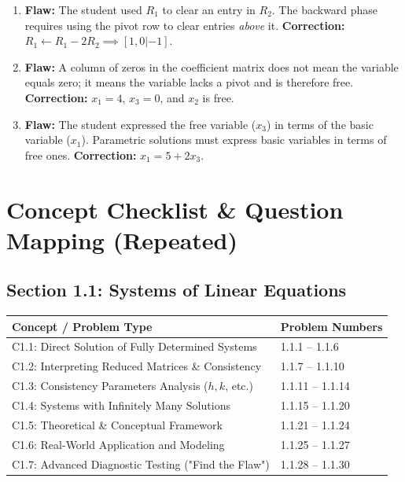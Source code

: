 \documentclass[11pt]{article}
\begin{document}
\begin{enumerate}[label=\textbf{Sol 1.2.\arabic*}]
    \item \textbf{Flaw:} The student used $R_1$ to clear an entry in $R_2$. The backward phase requires using the pivot row to clear entries \textit{above} it. \textbf{Correction:} $R_1 \leftarrow R_1 - 2R_2 \implies [1, 0 | -1]$.
    \item \textbf{Flaw:} A column of zeros in the coefficient matrix does not mean the variable equals zero; it means the variable lacks a pivot and is therefore free. \textbf{Correction:} $x_1=4$, $x_3=0$, and $x_2$ is free.
    \item \textbf{Flaw:} The student expressed the free variable ($x_3$) in terms of the basic variable ($x_1$). Parametric solutions must express basic variables in terms of free ones. \textbf{Correction:} $x_1 = 5 + 2x_3$.
\end{enumerate}

\newpage
\section{Concept Checklist \& Question Mapping (Repeated)}

\subsection*{Section 1.1: Systems of Linear Equations}
\begin{table}[h]
\centering
\begin{tabular}{@{}ll@{}}
\toprule
\textbf{Concept / Problem Type} & \textbf{Problem Numbers} \\ \midrule
C1.1: Direct Solution of Fully Determined Systems & 1.1.1 -- 1.1.6 \\
C1.2: Interpreting Reduced Matrices \& Consistency & 1.1.7 -- 1.1.10 \\
C1.3: Consistency Parameters Analysis ($h, k$, etc.) & 1.1.11 -- 1.1.14 \\
C1.4: Systems with Infinitely Many Solutions & 1.1.15 -- 1.1.20 \\
C1.5: Theoretical \& Conceptual Framework & 1.1.21 -- 1.1.24 \\
C1.6: Real-World Application and Modeling & 1.1.25 -- 1.1.27 \\
C1.7: Advanced Diagnostic Testing ("Find the Flaw") & 1.1.28 -- 1.1.30 \\ \bottomrule
\end{tabular}
\end{table}
\end{document}
